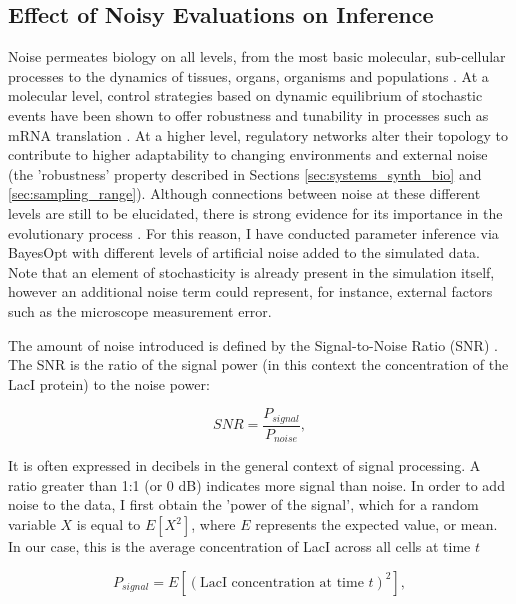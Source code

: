 \documentclass[bsc,frontabs,singlespacing,parskip,deptreport]{infthesis}
\begin{document}
\subsection{Effect of Noisy Evaluations on Inference}\label{sec:noise}
Noise permeates biology on all levels, from the most basic molecular, sub-cellular processes to the dynamics of tissues, organs, organisms and populations \cite{tsimring2014noise}. At a molecular level, control strategies based on dynamic equilibrium of stochastic events have been shown to offer robustness and tunability in processes such as mRNA translation \cite{10.3389/fgene.2014.00052, doi:10.1126/science.1242975}. At a higher level, regulatory networks alter their topology to contribute to higher adaptability to changing environments and external noise (the 'robustness' property described in Sections \ref{sec:systems_synth_bio} and \ref{sec:sampling_range}). Although connections between noise at these different levels are still to be elucidated, there is strong evidence for its importance in the evolutionary process \cite{pmid18319722}. For this reason, I have conducted parameter inference via BayesOpt with different levels of artificial noise added to the simulated data. Note that an element of stochasticity is already present in the simulation itself, however an additional noise term could represent, for instance, external factors such as the microscope measurement error. 


The amount of noise introduced is defined by the Signal-to-Noise Ratio (SNR) \cite{johnson2006signal}. The SNR is the ratio of the signal power (in this context the concentration of the LacI protein) to the noise power:

\begin{equation}\label{eq:SNR}
    SNR = \frac{P_{signal}}{P_{noise}}
,\end{equation}

It is often expressed in decibels in the general context of signal processing. A ratio greater than 1:1 (or 0 dB) indicates more signal than noise. In order to add noise to the data, I first obtain the 'power of the signal', which for a random variable $X$ is equal to $E[X^{2}]$, where $E$ represents the expected value, or mean. In our case, this is the average concentration of LacI across all cells at time $t$

\begin{equation}\label{eq:P_signal}
    P_{signal} = E[(\text{LacI concentration at time $t$})^{2}],
\end{equation}
\end{document}
